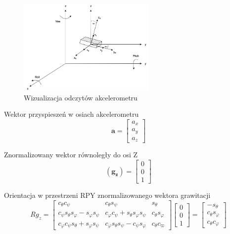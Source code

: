 \begin{figure}[!htb]
    \centering
    \includegraphics[width=0.6\textwidth]{Rysunki/Rozdzial03/Akcelerometr.png}
    \caption{Wizualizacja odczytów akcelerometru}
\end{figure}

Wektor przyspieszeń w osiach akcelerometru
$$
    \mathbf{a} = 
    \left[
    \begin{array}{cc}
        a_x \\
        a_y \\
        a_z
    \end{array}
    \right]
$$

Znormalizowany wektor równoległy do osi Z
$$
    \mathbf{(g_z)} =
    \left[
        \begin{array}{c}
            0 \\
            0 \\
            1
        \end{array}
    \right]
$$

Orientacja w przestrzeni RPY znormalizowanego wektora grawitacji
$$
R g_z = 
\left[
    \begin{array}{ccc}
        c_{\theta}c_{\psi} & c_{\theta}s_{\psi} & s_{\theta} \\
        c_{\psi}s_{\theta}s_{\varphi} - s_{\varphi}s_{\psi} & c_{\varphi}c_{\psi} + s_{\theta}s_{\varphi}s_{\psi} & c_{\theta}s_{\varphi} \\
        c_{\varphi}c_{\psi}s_{\theta} + s_{\varphi}s_{\psi} & c_{\varphi}s_{\theta}s_{\psi} - c_{\psi}s_{\varphi} & c_{\theta}c_{\varpi}
    \end{array}
\right]
\left[
    \begin{array}{c}
        0 \\
        0 \\
        1
    \end{array}
\right]
= 
\left[
    \begin{array}{c}
        -s_{\theta} \\
        c_{\theta}s_{\varphi} \\
        c_{\theta}c_{\varphi}
    \end{array}
\right]
$$

